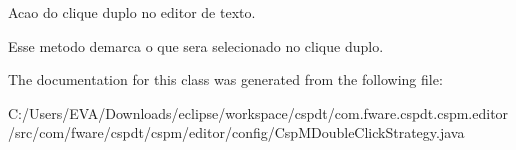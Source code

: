 Acao do clique duplo no editor de texto. 

Esse metodo demarca o que sera selecionado no clique duplo. 

The documentation for this class was generated from the following file\+:\begin{DoxyCompactItemize}
\item 
C\+:/\+Users/\+E\+V\+A/\+Downloads/eclipse/workspace/cspdt/com.\+fware.\+cspdt.\+cspm.\+editor/src/com/fware/cspdt/cspm/editor/config/Csp\+M\+Double\+Click\+Strategy.\+java\end{DoxyCompactItemize}

